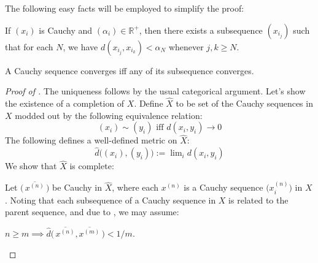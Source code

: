 	\noindent The following easy facts will be employed to simplify the proof:
	
	\begin{lem}\label{LEM: some properties of Cauchy sequences}
		\leavevmode
		\begin{mylist}
			\item If $(x_i)$ is Cauchy and $(\alpha_i)\in\mathbb R^+$, then there exists a subsequence $(x_{i_j})$ such that for each $N$, we have $d(x_{i_j}, x_{i_k}) < \alpha_N$ whenever $j, k\ge N$.
			
			\item A Cauchy sequence converges iff any of its subsequence converges.
		\end{mylist}
	\end{lem}
	
	\begin{proof}[Proof of ]
		The uniqueness follows by the usual categorical argument. Let's show the existence of a completion of $X$. Define $\hat X$ to be set of the Cauchy sequences in $X$ modded out by the following equivalence relation:
		\[
		(x_i)\sim (y_i) \text{ iff } d(x_i, y_i)\to 0
		\]
		The following defines a well-defined metric on $\hat X$:
		\[
		\hat d\bigl( (x_i), (y_i) \bigr) := \lim\nolimits_i d(x_i, y_i)
		\]
		We show that $\hat X$ is complete:
		\begin{subproof}
			Let $\bigl(\,\overline{x^{(n)}}\,\bigr)$ be Cauchy in $\hat X$, where each $x^{(n)}$ is a Cauchy sequence $\bigl(x^{(n)}_i\bigr)$ in $X$. Noting that each subsequence of a Cauchy sequence in $X$ is related to the parent sequence, and due to , we may \wlogg assume:
			\begin{mylist}
				\item $n \ge m\implies \hat d\bigl(\, \overline{x^{(n)}}, \overline{x^{(m)}}\, \bigr) < 1/m$.
				

\end{mylist}
\end{subproof}
\end{proof}

